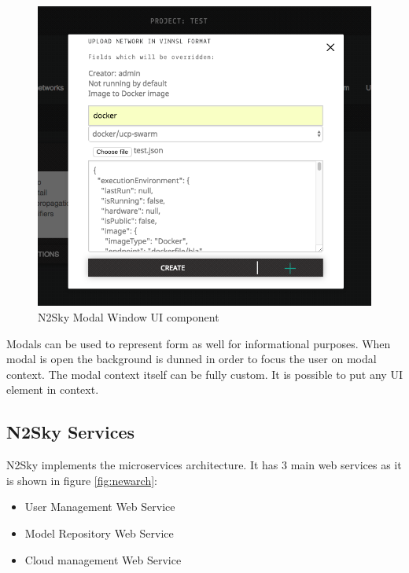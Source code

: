 \begin{description}
 \begin{figure}[H]
\begin{center}
  \includegraphics[scale=0.5]{components/3/components/modal.png}
  \caption{N2Sky Modal Window UI component}
  \label{fig:modal}
\end{center}
\end{figure}

Modals can be used to represent form as well for informational purposes. When modal is open the background is dunned in order to focus the user on modal context. The modal context itself can be fully custom. It is possible to put any UI element in context.



\end{description}



\subsection{N2Sky Services}\label{N2Sky Services}

 N2Sky implements the microservices architecture. It has 3 main web services as it is shown in figure \ref{fig:newarch}:
 
\begin{itemize}
\item User Management Web Service
\item Model Repository Web Service
\item Cloud management Web Service
\end{itemize}

